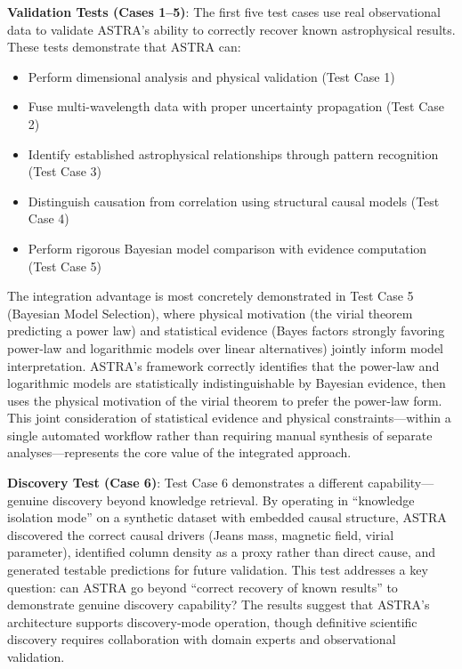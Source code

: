 \documentclass[usenatbib]{rasti}
\begin{document}
\textbf{Validation Tests (Cases 1--5)}: The first five test cases use real observational data to validate ASTRA's ability to correctly recover known astrophysical results. These tests demonstrate that ASTRA can:
\begin{itemize}
\item Perform dimensional analysis and physical validation (Test Case 1)
\item Fuse multi-wavelength data with proper uncertainty propagation (Test Case 2)
\item Identify established astrophysical relationships through pattern recognition (Test Case 3)
\item Distinguish causation from correlation using structural causal models (Test Case 4)
\item Perform rigorous Bayesian model comparison with evidence computation (Test Case 5)
\end{itemize}

The integration advantage is most concretely demonstrated in Test Case 5 (Bayesian Model Selection), where physical motivation (the virial theorem predicting a power law) and statistical evidence (Bayes factors strongly favoring power-law and logarithmic models over linear alternatives) jointly inform model interpretation. ASTRA's framework correctly identifies that the power-law and logarithmic models are statistically indistinguishable by Bayesian evidence, then uses the physical motivation of the virial theorem to prefer the power-law form. This joint consideration of statistical evidence and physical constraints---within a single automated workflow rather than requiring manual synthesis of separate analyses---represents the core value of the integrated approach.

\textbf{Discovery Test (Case 6)}: Test Case 6 demonstrates a different capability---genuine discovery beyond knowledge retrieval. By operating in ``knowledge isolation mode'' on a synthetic dataset with embedded causal structure, ASTRA discovered the correct causal drivers (Jeans mass, magnetic field, virial parameter), identified column density as a proxy rather than direct cause, and generated testable predictions for future validation. This test addresses a key question: can ASTRA go beyond ``correct recovery of known results'' to demonstrate genuine discovery capability? The results suggest that ASTRA's architecture supports discovery-mode operation, though definitive scientific discovery requires collaboration with domain experts and observational validation.
\end{document}
